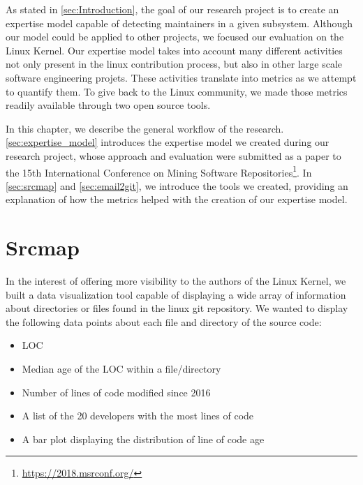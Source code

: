 \label{sec:Theme1}



As stated in \autoref{sec:Introduction}, the goal of our research project is to create an expertise model capable of detecting maintainers in a given subsystem. Although our model could be applied to other projects, we focused our evaluation on the Linux Kernel.
Our expertise model takes into account many different activities not only present in the linux contribution process, but also in other large scale software engineering projets. These activities translate into metrics as we attempt to quantify them. To give back to the Linux community, we made those metrics readily available through two open source tools.

In this chapter, we describe the general workflow of the research. \autoref{sec:expertise_model} introduces the expertise model we created during our research project, whose approach and evaluation were submitted as a paper to the 15th International Conference on Mining Software Repositories\footnote{\url{https://2018.msrconf.org/}}. In \autoref{sec:srcmap} and \autoref{sec:email2git}, we introduce the tools we created, providing an explanation of how the metrics helped with the creation of our expertise model. 





\section{Srcmap}
\label{sec:srcmap}

In the interest of offering more visibility to the authors of the Linux Kernel, we built a data visualization tool capable of displaying a wide array of information about directories or files found in the linux git repository. We wanted to display the following data points about each file and directory of the source code:

\begin{itemize}
	\item \ac{LOC}
	\item Median age of the \ac{LOC} within a file/directory
	\item Number of lines of code modified since 2016
	\item A list of the 20 developers with the most lines of code
	\item A bar plot displaying the distribution of line of code age
\end{itemize}

